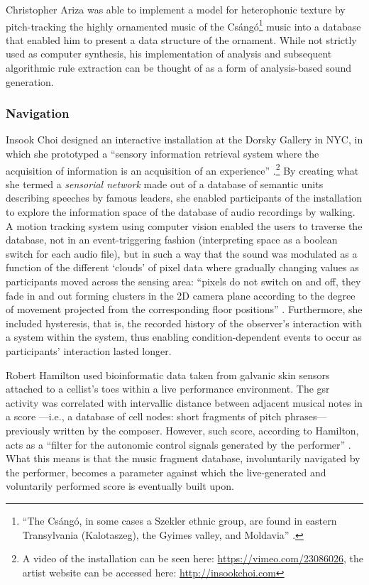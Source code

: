 Christopher Ariza \parencite{icmc/bbp2372.2003.030} was able to implement a model for heterophonic texture by pitch-tracking the highly ornamented music of the Csángó\footnote{``The Csángó, in some cases a Szekler ethnic group, are found in eastern Transylvania (Kalotaszeg), the Gyimes valley, and Moldavia'' \parencite{icmc/bbp2372.2003.030}.} music into a database that enabled him to present a data structure of the ornament. While not strictly used as computer synthesis, his implementation of analysis and subsequent algorithmic rule extraction can be thought of as a form of analysis-based sound generation.

\subsubsection{Navigation}
\label{applications:navigation}

Insook Choi \parencite{icmc/bbp2372.2000.146} designed an interactive installation at the Dorsky Gallery in NYC, in which she prototyped a ``sensory information retrieval system where the acquisition of information is an acquisition of an experience'' \parencite{icmc/bbp2372.2000.146}.\footnote{A video of the installation can be seen here: \url{https://vimeo.com/23086026}, the artist website can be accessed here: \url{http://insookchoi.com}} By creating what she termed a \textit{sensorial network} made out of a database of semantic units describing speeches by famous leaders, she enabled participants of the installation to explore the information space of the database of audio recordings by walking. A motion tracking system using computer vision enabled the users to traverse the database, not in an event-triggering fashion (interpreting space as a boolean switch for each audio file), but in such a way that the sound was modulated as a function of the different `clouds' of pixel data where gradually changing values as participants moved across the sensing area: ``pixels do not switch on and off, they fade in and out forming clusters in the 2D camera plane according to the degree of movement projected from the corresponding floor positions'' \parencite{icmc/bbp2372.2000.146}. Furthermore, she included hysteresis, that is, the recorded history of the observer's interaction with a system within the system, thus enabling condition-dependent events to occur as participants' interaction lasted longer.

Robert Hamilton \parencite{icmc/bbp2372.2006.123} used bioinformatic data taken from galvanic skin sensors attached to a cellist's toes within a live performance environment. The \gls{gsr} activity was correlated with intervallic distance between adjacent musical notes in a score ---i.e., a database of cell nodes: short fragments of pitch phrases--- previously written by the composer. However, such score, according to Hamilton, acts as a ``filter for the autonomic control signals generated by the performer'' \parencite[601]{icmc/bbp2372.2006.123}. What this means is that the music fragment database, involuntarily navigated by the performer, becomes a parameter against which the live-generated and voluntarily performed score is eventually built upon.

